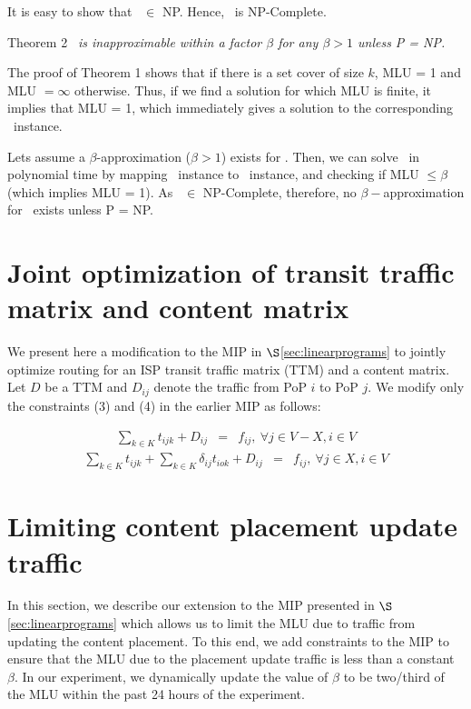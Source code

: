 It is easy to show that \optloc\ $\in$ NP. Hence, \optloc\ is NP-Complete.

\vspace{0.2in}

{{\sc Theorem 2}} {\em  \optloc\ is inapproximable within a factor $\beta$  for any $\beta > 1$ unless P = NP.}

\vspace{0.1in}

The proof of {\sc Theorem 1} shows that if there is a set cover of size $k$, MLU = 1 and MLU $= \infty$ otherwise. Thus, if we find a solution for which MLU is finite, it implies that MLU = 1, which immediately gives a solution to the corresponding \setcover\ instance.

Lets assume a  $\beta$-approximation ($\beta > 1$) exists for \optloc. Then, we can solve \setcover\ in polynomial time by mapping \setcover\ instance to \optloc\  instance, and checking if MLU $\leq \beta$ (which implies MLU = 1).  As \setcover\ $\in$ NP-Complete, therefore, no $\beta-$approximation for \optloc\ exists unless P = NP.

\section{Joint optimization of transit traffic matrix and content matrix}
\label{sec:ttmcm}

We present here a modification to the MIP in $\S$\ref{sec:linearprograms} to jointly optimize routing for an ISP transit traffic matrix (TTM) and a content matrix. Let $D$ be a TTM  and  $D_{ij}$ denote the traffic from PoP $i$ to PoP $j$. We modify only the constraints (3) and (4) in the earlier MIP as follows:

\begin{eqnarray}
\sum_{k \in K} t_{ijk}  + D_{ij}  &=& f_{ij} ,  \ \forall j \in V-X, i \in V
\end{eqnarray}
\begin{eqnarray}
\sum_{k \in K} t_{ijk} + \sum_{k \in K} \delta_{ij}  t_{iok}   + D_{ij} &=& f_{ij} ,  \ \forall j \in X, i \in V
\end{eqnarray}



\section{Limiting content placement update traffic}
\label{sec:placementupdate}
In this section, we describe our extension to the MIP presented in $\S$\ref{sec:linearprograms} which allows us to limit the MLU due to traffic from updating the content placement. To this end, we add constraints to the MIP to ensure that the MLU due to the placement update traffic is less than a constant $\beta$. In our experiment, we dynamically update the value of $\beta$ to be two/third of the MLU within the past 24 hours of the experiment. 

